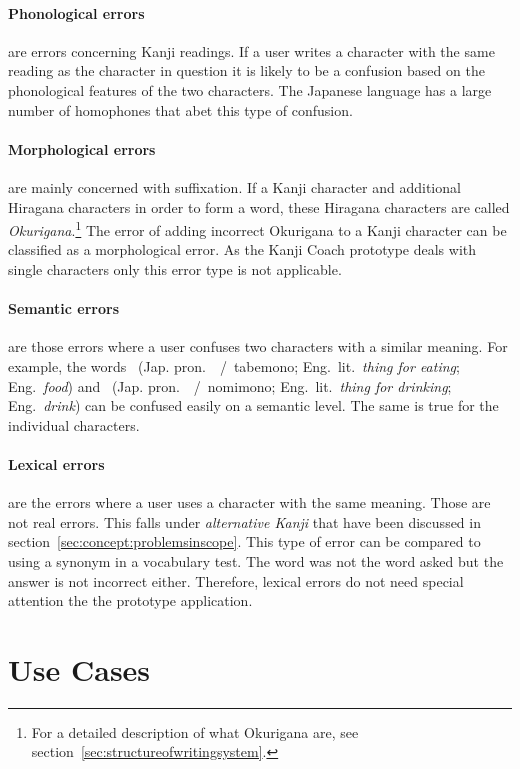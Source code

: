 \paragraph{Phonological errors} are errors concerning Kanji readings. If a user
writes a character with the same reading as the character in question it is 
likely to be a confusion based on the phonological features of the two 
characters. The Japanese language has a large number of homophones that abet
this type of confusion.

\paragraph{Morphological errors} are mainly concerned with suffixation.
If a Kanji character and additional Hiragana characters in order to form a word,
these Hiragana characters are called \emph{Okurigana}.\footnote{For a detailed 
description of what Okurigana are, see 
section~\ref{sec:structureofwritingsystem}.}
The error of adding incorrect Okurigana to a Kanji character can be classified
as a morphological error. As the Kanji Coach prototype deals with single 
characters only this error type is not applicable.

\paragraph{Semantic errors} are those errors where a user confuses two characters
with a similar meaning. For example, the words 
~(Jap. pron.~~/~tabemono; 
Eng.~lit.~\emph{thing for eating}; Eng.~\emph{food}) 
and 
~(Jap. pron.~~/~nomimono; 
Eng.~lit.~\emph{thing for drinking}; Eng.~\emph{drink})
can be confused easily on a semantic level. The same is true for the individual 
characters.
 
\paragraph{Lexical errors} are the errors where a user uses a character with the
same meaning. Those are not real errors. This falls under 
\emph{alternative Kanji} that have been discussed in 
section~\ref{sec:concept:problemsinscope}.
This type of error can be compared to using a synonym in a vocabulary test.
The word was not the word asked but the answer is not incorrect either.
Therefore, lexical errors do not need special attention the the prototype
application.

\section{Use Cases}
\label{sec:concept:usecases}

